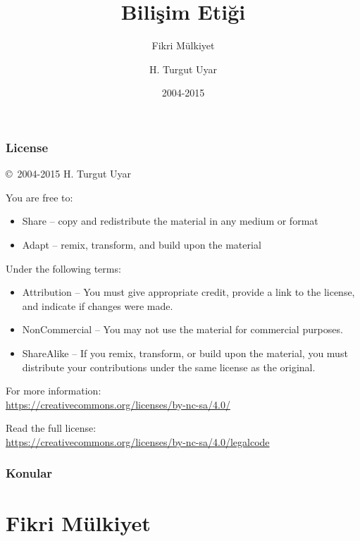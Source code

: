 \documentclass[dvipsnames]{beamer}
\title{Bilişim Etiği}
\subtitle{Fikri Mülkiyet}
\author{H. Turgut Uyar}
\date{2004-2015}
\theoremstyle{definition}
\theoremstyle{example}
\theoremstyle{plain}
\begin{document}
\begin{frame}
  \titlepage
\end{frame}

\begin{frame}
  \frametitle{License}

  \hfill
  \copyright~2004-2015 H. Turgut Uyar

  \vfill
  \begin{footnotesize}
    You are free to:
    \begin{itemize}
      \itemsep0em
      \item Share -- copy and redistribute the material in any medium or format
      \item Adapt -- remix, transform, and build upon the material
    \end{itemize}

    Under the following terms:
    \begin{itemize}
      \itemsep0em
      \item Attribution -- You must give appropriate credit, provide a link to
        the license, and indicate if changes were made.

      \item NonCommercial -- You may not use the material for commercial
        purposes.

      \item ShareAlike -- If you remix, transform, or build upon the material,
        you must distribute your contributions under the same license as the
        original.
    \end{itemize}
  \end{footnotesize}

  \begin{small}
    For more information:\\
    \url{https://creativecommons.org/licenses/by-nc-sa/4.0/}

    \smallskip
    Read the full license:\\
    \url{https://creativecommons.org/licenses/by-nc-sa/4.0/legalcode}
  \end{small}
\end{frame}

\begin{frame}
  \frametitle{Konular}
  \tableofcontents
\end{frame}

\section{Fikri Mülkiyet}
\end{document}
